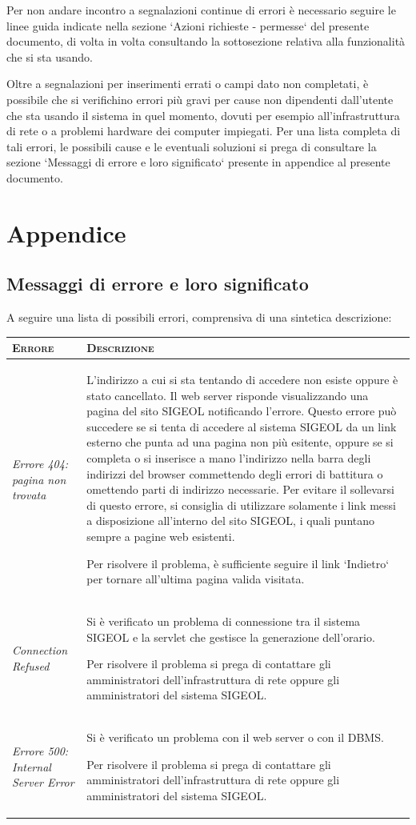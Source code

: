 \documentclass[11pt,a4paper]{article}
\begin{document}
Per non andare incontro a segnalazioni continue di errori è necessario seguire le linee guida indicate nella sezione `Azioni richieste - permesse` del presente documento, di volta in volta consultando la sottosezione relativa alla funzionalità che si sta usando.

Oltre a segnalazioni per inserimenti errati o campi dato non completati, è possibile che si verifichino errori più gravi per cause non dipendenti dall'utente che sta usando il sistema in quel momento, dovuti per esempio all'infrastruttura di rete o a problemi hardware dei computer impiegati.
Per una lista completa di tali errori, le possibili cause e le eventuali soluzioni si prega di consultare la sezione `Messaggi di errore e loro significato` presente in appendice al presente documento.
\newpage
\section{Appendice}
\subsection{Messaggi di errore e loro significato}
A seguire una lista di possibili errori, comprensiva di una sintetica descrizione:
\begin{center}
\begin{tabular}{|p{}|p{}|}
\hline
\textsc{Errore} & \textsc{Descrizione} \\
\hline
\hline
\textit{Errore 404: pagina non trovata} & L'indirizzo a cui si sta tentando di accedere non esiste oppure è stato cancellato. Il web server 
	risponde visualizzando una pagina del sito SIGEOL notificando l'errore. Questo errore può succedere se si tenta di accedere al sistema
	SIGEOL da un link esterno che punta ad una pagina non più esitente, oppure se si completa o si inserisce a mano l'indirizzo 
	nella barra degli indirizzi del browser commettendo degli errori di battitura o omettendo parti di indirizzo necessarie. Per
	evitare il sollevarsi di questo errore, si consiglia di utilizzare solamente i link messi a disposizione all'interno del sito SIGEOL, i quali
	puntano sempre a pagine web esistenti. 

	Per risolvere il problema, è sufficiente seguire il link `Indietro` per tornare all'ultima pagina valida visitata. \\
\hline
\textit{Connection Refused} & Si è verificato un problema di connessione tra il sistema SIGEOL e la servlet che gestisce la generazione dell'orario.

	Per risolvere il problema si prega di contattare gli amministratori dell'infrastruttura di rete oppure gli amministratori del sistema SIGEOL. \\
\hline
\textit{Errore 500: Internal Server Error} & Si è verificato un problema con il web server o con il DBMS. 

Per risolvere il problema si prega di contattare gli amministratori dell'infrastruttura di rete oppure gli amministratori del sistema SIGEOL. \\
\hline
\end{tabular}
\end{center}
\end{document}
